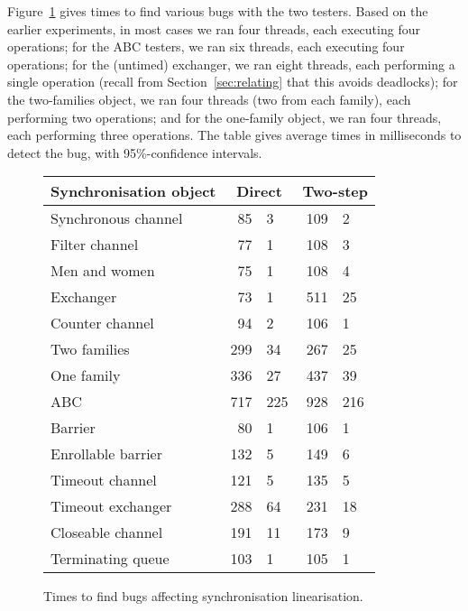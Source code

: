 
Figure~\ref{fig:bugFindingExperiment} gives times to find various bugs with
the two testers.  Based on the earlier experiments, in most cases we ran four
threads, each executing four operations; for the ABC testers, we ran six
threads, each executing four operations; for the (untimed) exchanger, we ran
eight threads, each performing a single operation (recall from
Section~\ref{sec:relating} that this avoids deadlocks); for the two-families
object, we ran four threads (two from each family), each performing two
operations; and for the one-family object, we ran four threads, each
performing three operations.  The table gives average times in milliseconds to
detect the bug, with 95\%-confidence intervals.


\begin{figure}
\begin{center}
\begin{tabular}{lr@{$\,\pm\,$}lr@{$\,\pm\,$}l}
Synchronisation object & \multicolumn{2}{c}{Direct} &
\multicolumn{2}{c}{Two-step} \\ \hline
Synchronous channel  &	85 	 & 3 &  	109	 & 2 \\
Filter channel &        77       & 1 &          108      & 3 \\
Men and women  &	75	 & 1 &  	108	 & 4 \\
Exchanger  	&       73	 & 1 &  	511	 & 25 \\
Counter channel &  	94	 & 2 &  	106	 & 1 \\
Two families &  	299	 & 34 &  	267	 & 25 \\
One family &    	336	 & 27 &         437      & 39 \\
ABC &    	        717	 & 225 &  	928	 & 216 \\
Barrier &       	80	 & 1 &   	106	 & 1 \\
Enrollable barrier &  	132	 & 5 &  	149	 & 6 \\
Timeout channel  &	121	 & 5 &  	135	 & 5 \\
Timeout exchanger & 	288	 & 64 &  	231	 & 18 \\
Closeable channel & 	191	 & 11 &  	173	 & 9 \\
Terminating queue & 	103	 & 1 &  	105	 & 1
\end{tabular}
\end{center}
\caption{Times to find bugs affecting synchronisation linearisation.}
\label{fig:bugFindingExperiment}
\end{figure}

